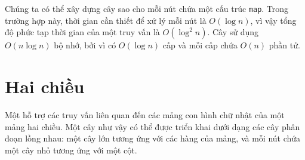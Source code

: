 Chúng ta có thể xây dựng cây sao cho
mỗi nút chứa một cấu trúc \texttt{map}.
Trong trường hợp này, thời gian cần thiết để xử lý mỗi
nút là $O(\log n)$, vì vậy tổng độ phức tạp thời gian
của một truy vấn là $O(\log^2 n)$.
Cây sử dụng $O(n \log n)$ bộ nhớ,
bởi vì có $O(\log n)$ cấp
và mỗi cấp chứa
$O(n)$ phần tử.

\section{Hai chiều}


Một  hỗ trợ
các truy vấn liên quan đến các mảng con hình chữ nhật
của một mảng hai chiều.
Một cây như vậy có thể được triển khai dưới dạng
các cây phân đoạn lồng nhau: một cây lớn tương ứng với
các hàng của mảng, và mỗi nút chứa một cây nhỏ
tương ứng với một cột.

